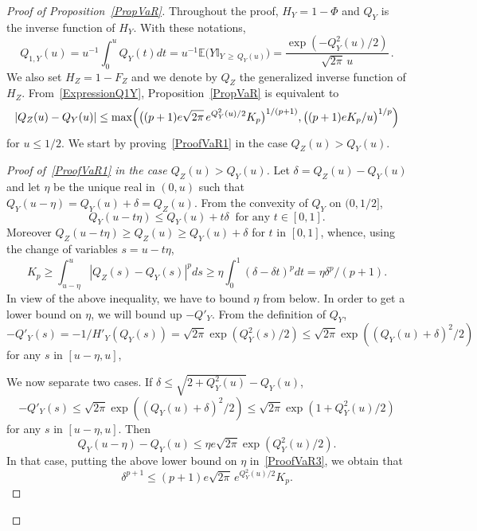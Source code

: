 \documentclass[10pt]{amsart}
\theoremstyle{definition}\newtheorem{defi}[theo]{Definition}\newtheorem{rema}[theo]{Remark}\newtheorem{exam}[theo]{Example}\newtheorem{exem}[theo]{Example}\newtheorem{nota}[theo]{Notation}
\newcommand{\bbE}{\mathbb{E}}
\newcommand{\bbI}{\mathbb{I}}
\begin{document}
\begin{proof}[{Proof of Proposition~\ref{PropVaR}}]
Throughout the proof, $H_Y = 1 - \Phi$ and $Q_Y$ is the inverse function of $H_Y$. With these notations,
\begin{equation}\label{ExpressionQ1Y}
Q_{1,Y} (u) = u^{-1} \int_0^u Q_Y (t) dt = u^{-1} \bbE \bigl(Y \bbI_{Y\,\geq\,Q_Y (u) } \bigr) =
\frac{ \exp \left(- Q_Y^2 (u) /2\right) }{ \sqrt{2\pi} \, u } \,.
\end{equation}
We also set $H_Z = 1-F_Z$ and we denote by $Q_Z$ the generalized inverse function of $H_Z$. From~\eqref{ExpressionQ1Y}, Proposition~\ref{PropVaR} is equivalent to
\begin{equation}\label{ProofVaR1}
| Q_Z (u) - Q_Y (u) | \leq \max \Bigl(\bigl((p+1)e \sqrt{2\pi} \, e^{Q_Y^2 (u) /2} K_p \bigr)^{1/(p+1)},
\bigl((p+1)e K_p /u \bigr)^{1/p} \Bigr)
\end{equation}
for $u\leq 1/2$. We start by proving~\eqref{ProofVaR1} in the case $Q_Z (u) > Q_Y (u)$.


\begin{proof}[{Proof of~\eqref{ProofVaR1} in the case $Q_Z (u) > Q_Y (u)$}]
Let $\delta = Q_Z (u) - Q_Y (u)$ and let $\eta$ be the unique real in $(0,u)$ such that $Q_Y (u-\eta) = Q_Y (u) + \delta = Q_Z (u)$. From the convexity of $Q_Y$ on $(0,1/2]$,
\begin{equation}\label{ProofVaR2}
Q_Y (u-t\eta) \leq Q_Y (u) + t \delta \ \text{ for any } t\in [0,1].
\end{equation}
Moreover $Q_Z (u - t \eta) \geq Q_Z (u) \geq Q_Y (u) + \delta$ for $t$ in $[0,1]$, whence, using the change of variables $s=u-t\eta$,
\begin{equation}\label{ProofVaR3}
K_p \geq
\int_{u-\eta}^u |Q_Z (s) - Q_Y (s) |^p ds \geq \eta \int_0^1 (\delta -\delta t)^p dt = \eta \delta^p / (p+1).
\end{equation}
In view of the above inequality, we have to bound $\eta$ from below. In order to get a lower bound on $\eta$, we will bound up $-Q'_Y$. From the definition of $Q_Y$,
\[
-Q'_Y (s) = -1/H'_Y (Q_Y (s)) = \sqrt{2\pi} \exp \left(Q_Y^2 (s) / 2\right) \leq \sqrt{2\pi} \exp \left((Q_Y (u) + \delta)^2 /2\right)
\]
for any $s$ in $[u-\eta, u]$,


We now separate two cases. If $\delta \leq \sqrt{2 + Q_Y^2 (u) } - Q_Y (u)$,
\[
- Q'_Y (s) \leq \sqrt{2\pi} \exp \left((Q_Y (u) + \delta)^2 /2\right) \leq \sqrt{2\pi} \exp \left(1 + Q_Y^2 (u) /2\right)
\]
for any $s$ in $[u-\eta, u]$. Then
\begin{equation}\label{Competadelta}
Q_Y (u-\eta) - Q_Y (u) \leq \eta e\sqrt{2\pi} \exp (Q_Y^2 (u) /2).
\end{equation}
In that case, putting the above lower bound on $\eta$ in~\eqref{ProofVaR3}, we obtain that
\begin{equation}\label{ProofVaR4}
\delta^{p+1} \leq (p+1)e \sqrt{2\pi} \, e^{Q_Y^2 (u) /2} K_p.
\end{equation}



\end{proof}
\end{proof}
\end{document}
